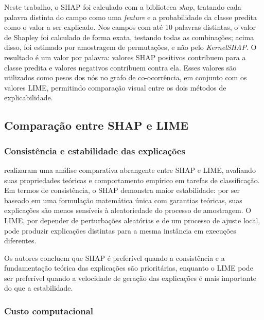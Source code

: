 \documentclass[
    12pt,                %
    openright,           %
    oneside,             %
    a4paper,             %
    english,             %
    brazil               %
]{abntex2}
\begin{document}
Neste trabalho, o SHAP foi calculado com a biblioteca \textit{shap}, tratando cada palavra distinta do campo como uma \textit{feature} e a probabilidade da classe predita como o valor a ser explicado. Nos campos com até 10 palavras distintas, o valor de Shapley foi calculado de forma exata, testando todas as combinações; acima disso, foi estimado por amostragem de permutações, e não pelo \textit{KernelSHAP}. O resultado é um valor por palavra: valores SHAP positivos contribuem para a classe predita e valores negativos contribuem contra ela. Esses valores são utilizados como pesos dos nós no grafo de co-ocorrência, em conjunto com os valores LIME, permitindo comparação visual entre os dois métodos de explicabilidade.

\subsection{Comparação entre SHAP e LIME}
\label{subsec:shap_lime}

\subsubsection{Consistência e estabilidade das explicações}
\label{subsubsec:comparacao_consistencia}

 realizaram uma análise comparativa abrangente entre SHAP e LIME, avaliando suas propriedades teóricas e comportamento empírico em tarefas de classificação. Em termos de consistência, o SHAP demonstra maior estabilidade: por ser baseado em uma formulação matemática única com garantias teóricas, suas explicações são menos sensíveis à aleatoriedade do processo de amostragem. O LIME, por depender de perturbações aleatórias e de um processo de ajuste local, pode produzir explicações distintas para a mesma instância em execuções diferentes.

Os autores concluem que SHAP é preferível quando a consistência e a fundamentação teórica das explicações são prioritárias, enquanto o LIME pode ser preferível quando a velocidade de geração das explicações é mais importante do que a estabilidade.

\subsubsection{Custo computacional}
\label{subsubsec:comparacao_custo}
\end{document}
